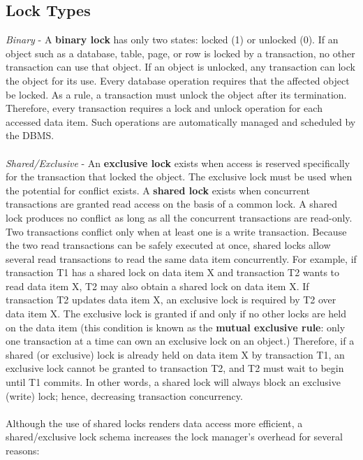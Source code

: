 \documentclass[a4paper, 11pt, titlepage]{report}
\begin{document}
\subsection{Lock Types}
\textit{Binary} - A \textbf{binary lock} has only two states: locked (1) or unlocked (0). If an object such as a database, table, page, or row is locked by a transaction, no other transaction can use that object. If an object is unlocked, any transaction can lock the object for its use. Every database operation requires that the affected object be locked. As a rule, a transaction must unlock the object after its termination. Therefore, every transaction requires a lock and unlock operation for each accessed data item. Such operations are automatically managed and scheduled by the DBMS.\\\\
\textit{Shared/Exclusive} - An \textbf{exclusive lock} exists when access is reserved specifically for the transaction that locked the object. The exclusive lock must be used when the potential for conflict exists. A \textbf{shared lock} exists when concurrent transactions are granted read access on the basis of a common lock. A shared lock produces no conflict as long as all the concurrent transactions are read-only.
Two transactions conflict only when at least one is a write transaction. Because the two read transactions can be safely executed at once, shared locks allow several read transactions to read the same data item concurrently. For example, if transaction T1 has a shared lock on data item X and transaction T2 wants to read data item X, T2 may also obtain a shared lock on data item X. If transaction T2 updates data item X, an exclusive lock is required by T2 over data item X. The exclusive lock is granted if and only if no other locks are held on the data item (this condition is known as the \textbf{mutual exclusive rule}: only one transaction at a time can own an exclusive lock on an object.) Therefore, if a shared (or exclusive) lock is already held on data item X by transaction T1, an exclusive lock cannot be granted to transaction T2, and T2 must wait to begin until T1 commits. In other words, a
shared lock will always block an exclusive (write) lock; hence, decreasing transaction concurrency.\\\\
Although the use of shared locks renders data access more efficient, a shared/exclusive
lock schema increases the lock manager's overhead for several reasons:
\end{document}
